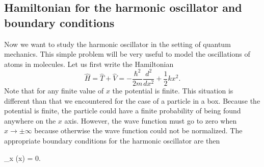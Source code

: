 \documentclass[../Main/chem331-notes.tex]{subfiles}
\begin{document}
\subsection{Hamiltonian for the harmonic oscillator and boundary conditions}
Now we want to study the harmonic oscillator in the setting of quantum mechanics.
This simple problem will be very useful to model the oscillations of atoms in molecules.
Let us first write the Hamiltonian
\begin{equation}
\hat{H} = \hat{T} + \hat{V} = -\frac{\hbar^2}{2m} \frac{d^2}{d x^2} + \frac{1}{2} k x^2.
\end{equation}
Note that for any finite value of $x$ the potential is finite. This situation is different than that we encountered for the case of a particle in a box.
Because the potential is finite, the particle could have a finite probability of being found anywhere on the $x$ axis.
However, the wave function must go to zero when $x \rightarrow \pm \infty$ because otherwise the wave function could not be normalized.
The appropriate boundary conditions for the harmonic oscillator are then
\begin{iequation}
\lim_{x \rightarrow \pm \infty} \psi(x) = 0.
\end{iequation}
\end{document}
